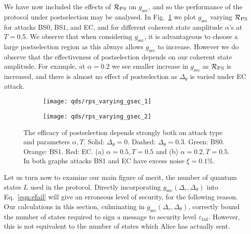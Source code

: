 We have now included the effects of $\mathcal{R}_{\text{PS}}$ on $g_{\text{sec}}$, and so the performance of the protocol under postselection may be analysed. In Fig.~\ref{fig:qds_gsec_varying_rps} we plot $g_{\text{sec}}$ varying $\mathcal{R}_{\text{PS}}$ for attacks BS$0$, BS$1$, and EC, and for different coherent state amplitude $\alpha$'s at $T=0.5$. We observe that when considering $g_{\text{sec}}$, it is advantageous to choose a large postselection region as this always allows $g_{\text{sec}}$ to increase. However we do observe that the effectiveness of postselection depends on our coherent state amplitude. For example, at $\alpha=0.2$ we see smaller increase in $g_{\text{sec}}$ as $\mathcal{R}_{\text{PS}}$ is increased, and there is almost no effect of postselection as $\Delta_\theta$ is varied under EC attack.


\begin{figure}[htp]
\captionsetup{width=0.8\linewidth}
\centering
	\begin{subfigure}{0.49\linewidth}
		\centering
		\texttt{[image: qds/rps\_varying\_gsec\_1]}
		\caption{}
	\end{subfigure}
	\begin{subfigure}{0.49\linewidth}
		\centering
		\texttt{[image: qds/rps\_varying\_gsec\_2]}
		\caption{}
	\end{subfigure}
\caption{\label{fig:qds_gsec_varying_rps} The efficacy of postselection depends strongly both on attack type and parameters $\alpha, T$. Solid: $\Delta_\theta = 0$. Dashed: $\Delta_\theta = 0.3$. Green: BS$0$. Orange: BS$1$.  Red: EC. (a) $\alpha = 0.5, T=0.5$ and (b) $\alpha = 0.2, T=0.5$. In both graphs attacks BS$1$ and EC have excess noise $\xi = 0.1\%$.  }
\end{figure}


Let us turn now to examine our main figure of merit, the number of quantum states $L$ used in the protocol. Directly incorporating $g_{\text{sec}}\left(\Delta_r, \Delta_\theta\right)$ into Eq.~\ref{eqn:efail} will give an erroneous level of security, for the following reason. Our calculations in this section, culminating in $g_{\text{sec}}\left(\Delta_r, \Delta_\theta\right)$, correctly bound the number of states required to sign a message to security level $\varepsilon_{\text{fail}}$. However, this is not equivalent to the number of states which Alice has actually sent. 

